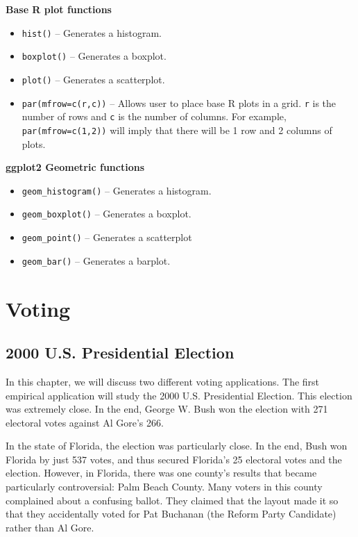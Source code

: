 \documentclass[
]{book}
\begin{document}
\textbf{Base R plot functions}

\begin{itemize}
\item
  \texttt{hist()} -- Generates a histogram.
\item
  \texttt{boxplot()} -- Generates a boxplot.
\item
  \texttt{plot()} -- Generates a scatterplot.
\item
  \texttt{par(mfrow=c(r,c))} -- Allows user to place base R plots in a grid. \texttt{r} is the number of rows and \texttt{c} is the number of columns. For example, \texttt{par(mfrow=c(1,2))} will imply that there will be 1 row and 2 columns of plots.
\end{itemize}

\textbf{ggplot2 Geometric functions}

\begin{itemize}
\item
  \texttt{geom\_histogram()} -- Generates a histogram.
\item
  \texttt{geom\_boxplot()} -- Generates a boxplot.
\item
  \texttt{geom\_point()} -- Generates a scatterplot
\item
  \texttt{geom\_bar()} -- Generates a barplot.
\end{itemize}

\chapter{Voting}\label{voting}

\section{2000 U.S. Presidential Election}\label{u.s.-presidential-election}

In this chapter, we will discuss two different voting applications. The first empirical application will study the 2000 U.S. Presidential Election. This election was extremely close. In the end, George W. Bush won the election with 271 electoral votes against Al Gore's 266.

In the state of Florida, the election was particularly close. In the end, Bush won Florida by just 537 votes, and thus secured Florida's 25 electoral votes and the election. However, in Florida, there was one county's results that became particularly controversial: Palm Beach County. Many voters in this county complained about a confusing ballot. They claimed that the layout made it so that they accidentally voted for Pat Buchanan (the Reform Party Candidate) rather than Al Gore.
\end{document}
